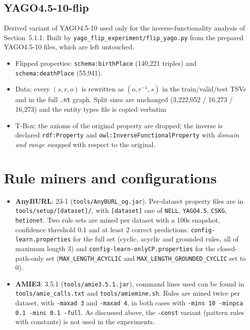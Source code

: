 \documentclass[runningheads]{llncs}
\begin{document}
\subsection*{YAGO4.5-10-flip}
Derived variant of YAGO4.5-10 used only for the inverse-functionality analysis of
Section~5.1.1. Built by \texttt{yago\_flip\_experiment/flip\_yago.py} from the prepared
YAGO4.5-10 files, which are left untouched.
\begin{itemize}
    \item Flipped properties: \texttt{schema:birthPlace} (140,221 triples) and
    \texttt{schema:deathPlace} (55,941). 
    \item Data: every $(s,r,o)$ is rewritten as $(o,r^{-1},s)$ in the train/valid/test TSVs and in
    the full \texttt{.nt} graph. Split sizes are unchanged (3,222,052 / 16,273 / 16,273) and the
    entity types file is copied verbatim
    \item T-Box: the axioms of the original property are dropped; the inverse is declared \texttt{rdf:Property} and
    \texttt{owl:InverseFunctionalProperty} with \emph{domain and range swapped} with respect to the
    original. 
\end{itemize}


\section{Rule miners and configurations}
\begin{itemize}
    \item \textbf{AnyBURL}: 23-1 (\texttt{tools/AnyBURL\_og.jar}). Per-dataset property files are in
    \texttt{tools/setup/[dataset]/}, with \texttt{[dataset]} one of \texttt{NELL}, \texttt{YAGO4.5},
    \texttt{CSKG}, \texttt{hetionet}. Two rule sets are mined per dataset with a
    100s snapshot, confidence threshold 0.1 and at least 2 correct predictions:
    \texttt{config-learn.properties} for the full set (cyclic, acyclic and grounded rules, all of
    maximum length 3) and \texttt{config-\allowbreak learn-\allowbreak onlyCP.properties} for the closed-path-only set
    (\texttt{MAX\_\allowbreak LENGTH\_\allowbreak ACYCLIC} and \texttt{MAX\_\allowbreak LENGTH\_\allowbreak GROUNDED\_\allowbreak CYCLIC} set to 0).
    \item \textbf{AMIE3}: 3.5.1 (\texttt{tools/amie3.5.1.jar}), command lines used can be found in
    \texttt{tools/amie\_calls.txt} and \texttt{tools/amiemine.sh}. Rules are mined twice per dataset,
    with \texttt{-maxad 3} and \texttt{-maxad 4}, in both cases with
    \texttt{-mins 10 -minpca 0.1 -minc 0.1 -full}. As discussed above, the \texttt{-const} variant
    (pattern rules with constants) is not used in the experiments.
\end{itemize}
\end{document}
